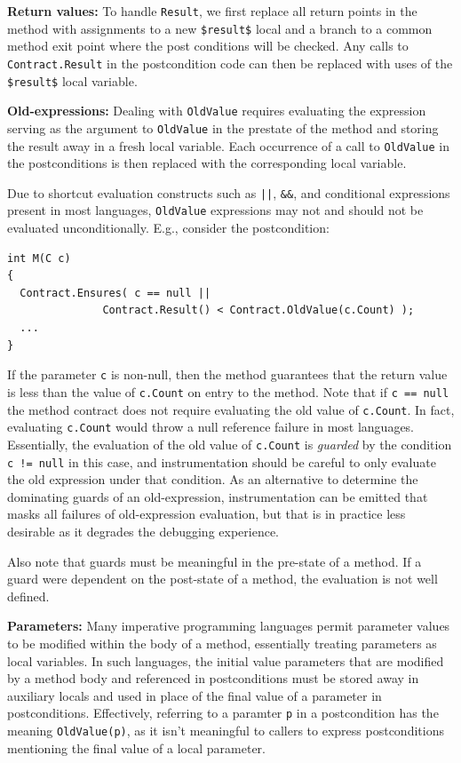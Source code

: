 \documentclass{sig-alternate}
\newcommand{\code}[1]{\lstinline{#1}}
\begin{document}
\textbf{Return values:} To handle \code{Result}, we first replace all return points in the
method with assignments to a new \code{$result$} local and a branch to
a common method exit point where the post conditions will be checked. 
Any calls to \code{Contract.Result} in the postcondition code can then
be replaced with uses of the \code{$result$} local variable.

\textbf{Old-expressions:} Dealing with \code{OldValue} requires evaluating the expression
serving as the argument to \code{OldValue} in the prestate of the
method and storing the result away in a fresh local variable. Each
occurrence of a call to \code{OldValue} in the postconditions is then
replaced with the corresponding local variable. 

Due to shortcut evaluation constructs such as \code{||}, \code{&&},
and conditional expressions present in most languages, \code{OldValue}
expressions may not and should not be evaluated unconditionally. E.g.,
consider the postcondition:
\begin{lstlisting}
int M(C c) 
{
  Contract.Ensures( c == null || 
               Contract.Result() < Contract.OldValue(c.Count) );
  ...
}
\end{lstlisting}
If the parameter \code{c} is non-null, then the method guarantees that
the return value is less than the value of \code{c.Count} on entry to
the method. Note that if \code{c == null} the method contract does not
require evaluating the old value of \code{c.Count}. In fact,
evaluating \code{c.Count} would throw a null reference failure in most
languages. Essentially, the evaluation of the old value of
\code{c.Count} is \emph{guarded} by the condition \code{c != null} in
this case, and instrumentation should be careful to only evaluate the
old expression under that condition. As an alternative to determine
the dominating guards of an old-expression, instrumentation can be
emitted that masks all failures of old-expression evaluation, but that
is in practice less desirable as it degrades the debugging experience.

Also note that guards must be meaningful in the pre-state of a
method. If a guard were dependent on the post-state of a method, the
evaluation is not well defined.

\textbf{Parameters:} Many imperative programming languages permit
parameter values to be modified within the body of a method,
essentially treating parameters as local variables. In such languages,
the initial value parameters that are modified by a method body and referenced in
postconditions must be stored away in auxiliary locals and used in
place of the final value of a parameter in
postconditions. Effectively, referring to a paramter \code{p} in a
postcondition has the meaning \code{OldValue(p)}, as it isn't
meaningful to callers to express postconditions mentioning the final value of a
local parameter.
\end{document}
